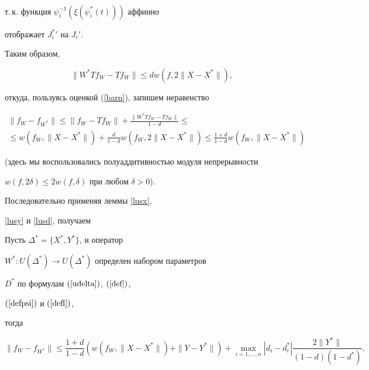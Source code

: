 \begin{pf}
\begin{multline*}
\end{multline*}


т.\,к. функция $ \psi_i^{-1}(\xi(\psi_i^*(t))) $ аффинно


отображает ${J_i^*}'$ на $J_i'$.


Таким образом,


$$ \| W^* T f_W - T f_W \| \le d w(f, 2\|X-X^*\|), $$


откуда, пользуясь оценкой (\ref{barn}), запишем неравенство


\begin{multline*}


\| f_W- f_{W^*} \| \le \| f_W - T f_W\| +


\frac {\| W^* T f_W - T f_W \|}{1-d} \le \\


%


\le w(f_W , \| X - X^* \|)+ \frac {d}{1-d} w(f_W , 2 \| X - X^* \|) \le


\frac {1+d}{1-d} w(f_W , \| X - X^* \|)


\end{multline*}


(здесь мы воспользовались полуаддитивностью модуля непрерывности


$w(f,2\delta) \le 2 w(f,\delta) $ при любом $\delta>0$).


\end{pf}





Последовательно применяя леммы \ref{lusx},


\ref{lusy} и \ref{lusd}, получаем





\begin{prop}


Пусть $\Delta^*=\{ X^*,Y^* \}$, и оператор


$W^* : U (\Delta^*) \to U (\Delta^*)$ определен набором параметров


$D^*$ по формулам $(\ref{udelta})$, $(\ref{def})$,


$(\ref{defpsi})$ и $(\ref{defl})$,


тогда


$$


\| f_W- f_{W^*} \| \le \frac {1+d}{1-d} \left(w(f_W , \| X - X^* \|)+


\|Y-Y^*\| \right) + \max_{i=1,\dotsc,n} |d_i-d_i^*|


\frac{ 2 \| Y^* \| }{(1-d)(1-d^*)} .


$$


\end{prop}






